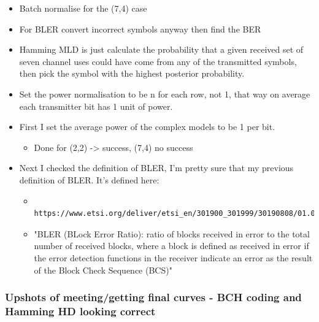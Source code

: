 \documentclass[12pt,onecolumn,letterpaper]{article}
\begin{document}
\begin{itemize}
   \item Batch normalise for the (7,4) case
   \item For BLER convert incorrect symbols anyway then find the BER
   \item Hamming MLD is just calculate the probability that a given received set of seven channel uses could have come from any of the transmitted symbols, then pick the symbol with the highest posterior probability.
   \item Set the power normalisation to be n for each row, not 1, that way on average each transmitter bit has 1 unit of power.
   \item First I set the average power of the complex models to be 1 per bit.
   \begin{itemize}
      \item Done for (2,2) -> success, (7,4) no success
   \end{itemize}
   \item Next I checked the definition of BLER, I'm pretty sure that my previous definition of BLER. It's defined here:
   \begin{itemize}
      \item \begin{verbatim}
         https://www.etsi.org/deliver/etsi_en/301900_301999/30190808/01.01.01_30/en_30190808v010101v.pdfhttps://www.etsi.org/deliver/etsi_en/301900_301999/30190808/01.01.01_30/en_30190808v010101v.pdf
         \end{verbatim}
      \item "BLER (BLock Error Ratio): ratio of blocks received in error to the total number of received blocks, where a block is defined as received in error if the error detection functions in the receiver indicate an error as the result of the Block Check Sequence (BCS)"
   \end{itemize}
\end{itemize}

\subsubsection{Upshots of meeting/getting final curves - BCH coding and Hamming HD looking correct}
\end{document}
